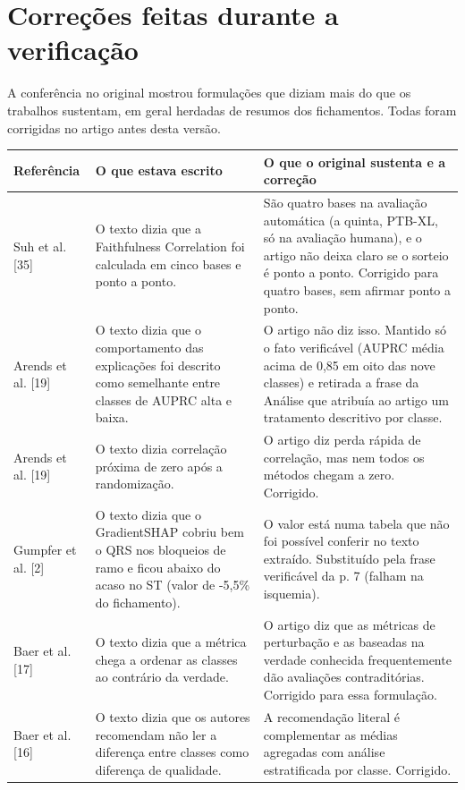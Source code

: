\documentclass[11pt,a4paper]{article}
\begin{document}
\section{Correções feitas durante a verificação}
A conferência no original mostrou formulações que diziam mais do que os trabalhos sustentam, em geral herdadas de resumos dos fichamentos. Todas foram corrigidas no artigo antes desta versão.
\begin{longtable}{>{\raggedright\arraybackslash}p{3.0cm}>{\raggedright\arraybackslash}p{6.2cm}>{\raggedright\arraybackslash}p{7.2cm}}
\toprule
\textbf{Referência} & \textbf{O que estava escrito} & \textbf{O que o original sustenta e a correção} \\
\midrule
Suh et al. [35] & O texto dizia que a Faithfulness Correlation foi calculada em cinco bases e ponto a ponto. & São quatro bases na avaliação automática (a quinta, PTB-XL, só na avaliação humana), e o artigo não deixa claro se o sorteio é ponto a ponto. Corrigido para quatro bases, sem afirmar ponto a ponto. \\
\addlinespace
Arends et al. [19] & O texto dizia que o comportamento das explicações foi descrito como semelhante entre classes de AUPRC alta e baixa. & O artigo não diz isso. Mantido só o fato verificável (AUPRC média acima de 0,85 em oito das nove classes) e retirada a frase da Análise que atribuía ao artigo um tratamento descritivo por classe. \\
\addlinespace
Arends et al. [19] & O texto dizia correlação próxima de zero após a randomização. & O artigo diz perda rápida de correlação, mas nem todos os métodos chegam a zero. Corrigido. \\
\addlinespace
Gumpfer et al. [2] & O texto dizia que o GradientSHAP cobriu bem o QRS nos bloqueios de ramo e ficou abaixo do acaso no ST (valor de -5,5\% do fichamento). & O valor está numa tabela que não foi possível conferir no texto extraído. Substituído pela frase verificável da p. 7 (falham na isquemia). \\
\addlinespace
Baer et al. [17] & O texto dizia que a métrica chega a ordenar as classes ao contrário da verdade. & O artigo diz que as métricas de perturbação e as baseadas na verdade conhecida frequentemente dão avaliações contraditórias. Corrigido para essa formulação. \\
\addlinespace
Baer et al. [16] & O texto dizia que os autores recomendam não ler a diferença entre classes como diferença de qualidade. & A recomendação literal é complementar as médias agregadas com análise estratificada por classe. Corrigido. \\

\end{longtable}
\end{document}
